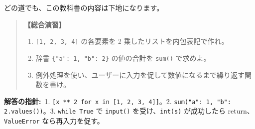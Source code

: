 \documentclass{article}
\begin{document}
どの道でも、この教科書の内容は下地になります。

\begin{quote}
\textbf{【総合演習】}
\begin{enumerate}
\item \texttt{[1, 2, 3, 4]} の各要素を 2 乗したリストを内包表記で作れ。
\item 辞書 \texttt{\{"a": 1, "b": 2\}} の値の合計を \texttt{sum()} で求めよ。
\item 例外処理を使い、ユーザーに入力を促して数値になるまで繰り返す関数を書け。
\end{enumerate}
\end{quote}

\textbf{解答の指針:}\ 1. \texttt{[x ** 2 for x in [1, 2, 3, 4]]}。2. \texttt{sum({"a": 1, "b": 2}.values())}。3. \texttt{while True} で \texttt{input()} を受け、\texttt{int(s)} が成功したら return、\texttt{ValueError} なら再入力を促す。
\end{document}
